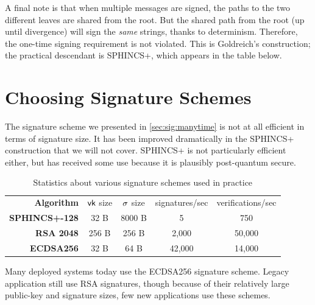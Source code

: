 A final note is that when multiple messages are signed, the paths to the two different leaves are shared from the root. But the shared path from the root (up until divergence) will sign the \emph{same} strings, thanks to determinism. Therefore, the one-time signing requirement is not violated.
This is Goldreich's construction; the practical descendant is SPHINCS+, which appears in the table below.


\section{Choosing Signature Schemes}
The signature scheme we presented in \cref{sec:sig:manytime}
is not at all efficient in terms of signature size. It has been improved dramatically in the SPHINCS+ construction that we will not cover. SPHINCS+ is not particularly efficient either, but has received some use because it is plausibly post-quantum secure.

\begin{table}[htpb]
	\centering
	\caption{Statistics about various signature schemes used in practice}
	\label{tab:sig_schemes}

	\begin{tabular}{rcccc}
		\textbf{Algorithm} & $\mathsf{vk}$ size & $\sigma$ size & signatures/sec & verifications/sec \\
		\bf{SPHINCS+-128} & 32 B & 8000 B & 5 & 750 \\
		\bf{RSA 2048} & 256 B & 256 B & 2,000 & 50,000 \\
		\bf{ECDSA256} & 32 B & 64 B & 42,000 & 14,000 \\
	\end{tabular}
\end{table}

Many deployed systems today use the ECDSA256 signature scheme.
Legacy application still use RSA signatures, though because of their
relatively large public-key and signature sizes, few new applications
use these schemes.

